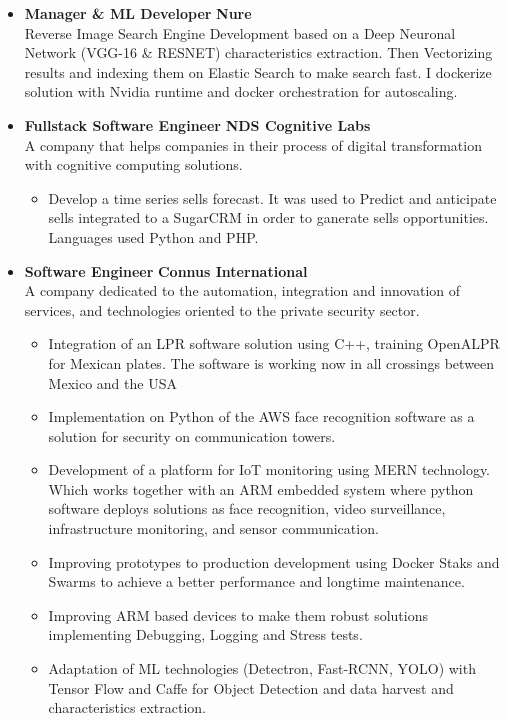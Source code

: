 \documentclass[]{friggeri-cv}
\renewenvironment{entrylist}{%
  \begin{itemize}[leftmargin=0.25in,align=left,itemindent=-\dimexpr\labelindent\relax]
}{%
  \end{itemize}
}
\renewcommand{\entry}[4]{%
  \item[#1] 
    \textbf{#2}%
    \hfill%
    {\footnotesize\textbf{\addfontfeature{Color=pblue} #3 }}\\%
    #4\vspace{\parsep}%
  }
\begin{document}
\begin{entrylist}

  \entry
    {06/18 - Present}
    {Manager \& ML Developer}
    {Nure\vspace{1mm}}
    { Reverse Image Search Engine Development based on a Deep Neuronal Network (VGG-16 \& RESNET) characteristics extraction. Then Vectorizing results and indexing them on Elastic Search to make search fast. I dockerize solution with Nvidia runtime and docker orchestration for autoscaling.\vspace{-1mm}}
 

  \entry
    {09/18 - 02/19}
    {Fullstack Software Engineer}
    {NDS Cognitive Labs}
    {A company that helps companies in their process of digital transformation with cognitive computing solutions.\vspace{-1mm}
    \begin{itemize}[label=$•$]
    \addtolength{\itemindent}{-4mm}
    	\item Develop a time series sells forecast. It was used to Predict and anticipate sells integrated to a SugarCRM in order to ganerate sells opportunities. Languages used Python and PHP.
	\end{itemize}
    }


  \entry
    {03/17 - 09/18}
    {Software Engineer}
    {Connus International}
    {A company dedicated to the automation, integration and innovation of services, and technologies oriented to the private security sector.\vspace{-1mm}
    \begin{itemize}[label=$•$]
    \addtolength{\itemindent}{-4mm}
    	\item Integration of an LPR software solution using C++, training OpenALPR for Mexican plates. The software is working now in all crossings between Mexico and the USA
    	\item Implementation on Python of the AWS face recognition software as a solution for security on communication towers.
    	\item Development of a platform for IoT monitoring using MERN technology. Which works together with an ARM embedded system where python software deploys solutions as face recognition, video surveillance, infrastructure monitoring, and sensor communication.
		\item Improving prototypes to production development using Docker Staks and Swarms to achieve a better performance and longtime maintenance.
		\item Improving ARM based devices to make them robust solutions implementing Debugging, Logging and Stress tests.
		\item Adaptation of ML technologies (Detectron, Fast-RCNN, YOLO) with Tensor Flow  and Caffe for Object Detection and data harvest and characteristics extraction.
	\end{itemize}
    }


\end{entrylist}
\end{document}

